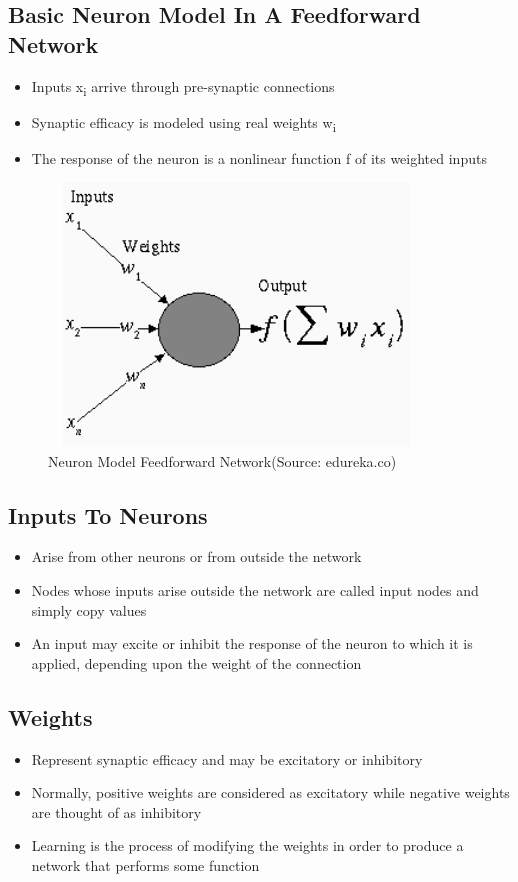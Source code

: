 \subsection{Basic Neuron Model In A Feedforward Network}
\begin{itemize}
    \item Inputs x\textsubscript{i} arrive through pre-synaptic connections 
    \item Synaptic efficacy is modeled using real weights w\textsubscript{i}
    \item The response of the neuron is a nonlinear function f of its weighted inputs
\end{itemize}

 \begin{figure}[h]
  \begin{center}
  \includegraphics[width=100mm,height=70mm]{images/back.png}
  \caption{Neuron Model Feedforward Network(Source: edureka.co)}
  \end{center}
  \end{figure}   
  
\subsection{Inputs To Neurons}
\begin{itemize}
    \item Arise from other neurons or from outside the network
    \item Nodes whose inputs arise outside the network are called input nodes and simply copy values
    \item An input may excite or inhibit the response of the neuron to which it is applied, depending upon the weight of the connection
\end{itemize}

\subsection{Weights}
\begin{itemize}
    \item Represent synaptic efficacy and may be excitatory or inhibitory
    \item Normally, positive weights are considered as excitatory while negative weights are thought of as inhibitory
    \item Learning is the process of modifying the weights in order to produce a network that performs some function
\end{itemize}

